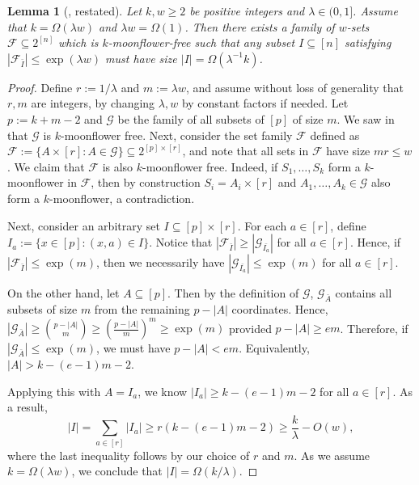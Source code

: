 \documentclass{article}
\newtheorem{lemma}[lemma]{Lemma}
\newcommand{\<}{\langle}
\renewcommand{\>}{\rangle}
\newcommand{\calF}{\mathcal{F}}
\newcommand{\calG}{\mathcal{G}}
\begin{document}
\begin{lemma}[, restated]\label{lem:universe_reduction_lower_bnd_restated}
        Let $k, w \geq 2$ be positive integers and $\lambda \in (0,1]$. Assume that $k=\Omega(\lambda w)$ and $\lambda w = \Omega(1)$.  
    Then there exists a family of $w$-sets $\calF \subseteq 2^{[n]}$ which is $k$-moonflower-free such that any subset $I \subseteq [n]$ satisfying $|\calF_{\bar{I}}| \leq \exp (\lambda w)$ must have size $|I|=\Omega(\lambda^{-1} k)$.
\end{lemma}

\begin{proof}
    Define $r := 1/\lambda$ and $m:= \lambda w$, and assume without loss of generality that $r,m$ are integers, by changing $\lambda, w$ by constant factors if needed. Let $p:= k+m-2$ and $\calG$ be the family of all subsets of $[p]$ of size $m$. We saw in  that $\calG$ is $k$-moonflower free.
    Next, consider the set family $\calF$ defined as $\calF:= \{A \times [r]: A \in \calG\} \subseteq 2^{[p] \times [r]}$, and note that all sets in $\calF$ have size $mr \le w$. We claim that $\calF$ is also $k$-moonflower free. Indeed, if $S_1,\ldots,S_k$ form a $k$-moonflower in $\calF$, then by construction $S_i = A_i \times [r]$ and $A_1,\ldots,A_k \in \calG$ also form a $k$-moonflower, a contradiction.

    Next, consider an arbitrary set $I \subseteq [p] \times [r]$. For each $a \in [r]$, define $I_a:= \{x \in [p]: (x, a) \in I\}$. Notice that $|\calF_{\bar{I}}| \geq |\calG_{\bar{I_a}}|$ for all $a \in [r]$. Hence, if $|\calF_{\bar{I}}| \leq \exp (m)$, then we necessarily have $|\calG_{\bar{I_a}}| \leq \exp (m)$ for all $a \in [r]$. 

    On the other hand, let $A \subseteq [p]$. Then by the definition of $\calG$, $\calG_{\bar{A}}$ contains all subsets of size $m$ from the remaining $p - |A|$ coordinates. Hence, $|\calG_{\bar{A}}| \geq \binom{p-|A|}{m} \geq \left(\frac{p-|A|}{m}\right)^m \geq \exp (m)$ provided $p-|A| \geq em$. Therefore, if  $|\calG_{\bar{A}}| \leq \exp (m)$, we must have $p- |A| < em$. Equivalently, $|A| > k- (e-1)m - 2$.

    Applying this with $A = I_{a}$, we know $|I_a| \geq k - (e-1)m - 2$ for all $a \in [r]$. As a result,
    \[
    |I| = \sum_{a \in [r]}|I_a| \geq r(k - (e-1)m - 2) \geq \frac{k}{\lambda} - O(w),
    \]
    where the last inequality follows by our choice of $r$ and $m$. As we assume $k = \Omega(\lambda w)$, we conclude that $|I|=\Omega(k/\lambda)$. 
\end{proof}
\end{document}
